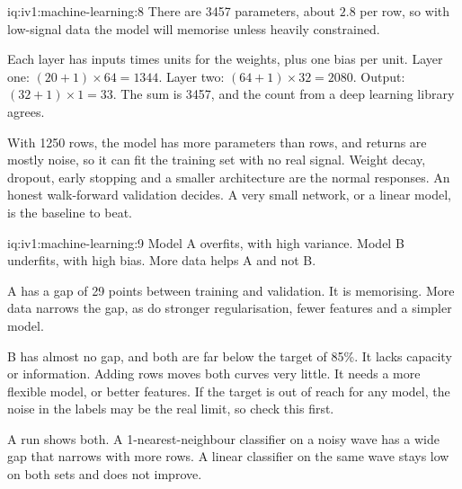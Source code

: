 \begin{solution}{iq:iv1:machine-learning:8}
There are 3457 parameters, about $2.8$ per row, so with low-signal data the model will memorise unless heavily constrained.

Each layer has inputs times units for the weights, plus one bias per unit. Layer one: $(20 + 1) \times 64 = 1344$. Layer two: $(64 + 1) \times 32 = 2080$. Output: $(32 + 1) \times 1 = 33$. The sum is 3457, and the count from a deep learning library agrees.

With 1250 rows, the model has more parameters than rows, and returns are mostly noise, so it can fit the training set with no real signal. Weight decay, dropout, early stopping and a smaller architecture are the normal responses. An honest walk-forward validation decides. A very small network, or a linear model, is the baseline to beat.



\end{solution}

\begin{solution}{iq:iv1:machine-learning:9}
Model A overfits, with high variance. Model B underfits, with high bias. More data helps A and not B.

A has a gap of 29 points between training and validation. It is memorising. More data narrows the gap, as do stronger regularisation, fewer features and a simpler model.

B has almost no gap, and both are far below the target of 85\%. It lacks capacity or information. Adding rows moves both curves very little. It needs a more flexible model, or better features. If the target is out of reach for any model, the noise in the labels may be the real limit, so check this first.

A run shows both. A 1-nearest-neighbour classifier on a noisy wave has a wide gap that narrows with more rows. A linear classifier on the same wave stays low on both sets and does not improve.



\end{solution}

